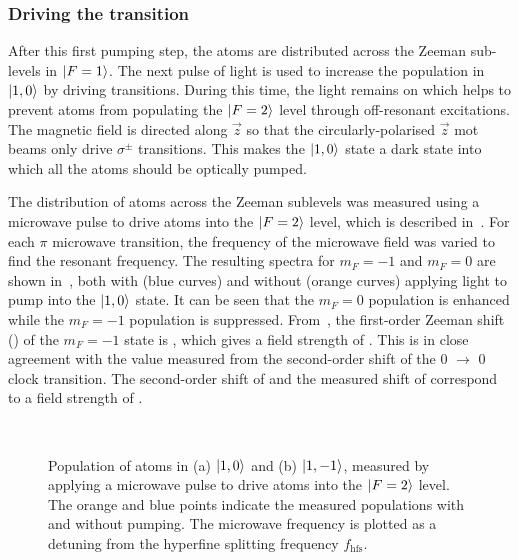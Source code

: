 \subsubsection{Driving the  transition}
After this first pumping step, the atoms are distributed across the
Zeeman sub-levels in \(\ket{F=1}\). The next pulse of light is used to
increase the population in \(\ket{1,0}\) by driving 
transitions. During this time, the  light remains on which
helps to prevent atoms from populating the \(\ket{F=2}\) level through
off-resonant  excitations. The magnetic field is directed
along $\vec{z}$ so that the circularly-polarised \(\vec{z}\) \ac{mot} beams only
drive \(\sigma^{\pm}\) transitions. This makes the \(\ket{1,0}\) state
a dark state into which all the atoms should be optically pumped. 
\par\noindent
The distribution of atoms across the Zeeman sublevels was measured
using a microwave pulse to drive atoms into the \(\ket{F=2}\) level,
which is described in~. For each \(\pi\)
microwave transition, the frequency of the microwave field was varied
to find the resonant frequency. The resulting spectra for \(m_F = -1\)
and \(m_F = 0\) are shown in~,
both with (blue curves) and without (orange curves) applying light to pump into the \(\ket{1,0}\)
state. It can be seen that the $m_F=0$ population is enhanced while
the $m_F=-1$ population is suppressed. From~, the first-order
Zeeman shift () of the $m_F = -1$ state is , which gives a
field strength of . This is in close agreement
with the value measured from the second-order shift of the 0
\(\rightarrow\) 0 clock transition. The second-order shift of
 and the measured shift of
 correspond to a field strength of
. 
\begin{figure}[!htbp]
    \centering
    \def\svgwidth{\columnwidth}
    \\
    \caption[\(m_F\) populations before and after  pumping]{Population of atoms in (a) \(\ket{1,0}\) and (b) \(\ket{1,-1}\), measured by applying a  microwave pulse to drive atoms into the \(\ket{F=2}\) level. The orange and blue points indicate the measured populations with and without  pumping. The microwave frequency is plotted as a detuning from the hyperfine splitting frequency \(f_\text{hfs}\).}
    \label{fig:step2_microwave_spec}
\end{figure} 
